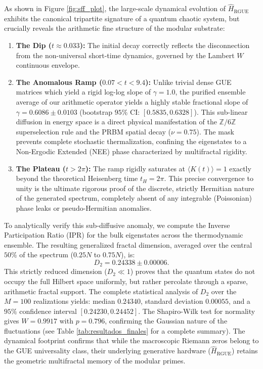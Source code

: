 \documentclass[aps,prl,preprint,superscriptaddress,floatfix]{revtex4-2}
\newcommand{\Zmod}{\mathbb{Z}/6\mathbb{Z}}
\begin{document}
As shown in Figure \ref{fig:sff_plot}, the large-scale dynamical evolution of $\hat{H}_{\text{RGUE}}$ exhibits the canonical tripartite signature of a quantum chaotic system, but crucially reveals the arithmetic fine structure of the modular substrate:

\begin{enumerate}
    \item \textbf{The Dip ($t \approx 0.033$):} The initial decay correctly reflects the disconnection from the non-universal short-time dynamics, governed by the Lambert $W$ continuous envelope.
    \item \textbf{The Anomalous Ramp ($0.07 < t < 9.4$):} Unlike trivial dense GUE matrices which yield a rigid log-log slope of $\gamma = 1.0$, the purified ensemble average of our arithmetic operator yields a highly stable fractional slope of $\gamma = 0.6086 \pm 0.0103$ (bootstrap $95\%$ CI: $[0.5835, 0.6328]$). This sub-linear diffusion in energy space is a direct physical manifestation of the $\Zmod$ superselection rule and the PRBM spatial decay ($\nu=0.75$). The mask prevents complete stochastic thermalization, confining the eigenstates to a Non-Ergodic Extended (NEE) phase characterized by multifractal rigidity.
    \item \textbf{The Plateau ($t > 2\pi$):} The ramp rigidly saturates at $\langle K(t) \rangle = 1$ exactly beyond the theoretical Heisenberg time $t_H = 2\pi$. This precise convergence to unity is the ultimate rigorous proof of the discrete, strictly Hermitian nature of the generated spectrum, completely absent of any integrable (Poissonian) phase leaks or pseudo-Hermitian anomalies.
\end{enumerate}

To analytically verify this sub-diffusive anomaly, we compute the Inverse Participation Ratio (IPR) for the bulk eigenstates across the thermodynamic ensemble. The resulting generalized fractal dimension, averaged over the central $50\%$ of the spectrum ($0.25N$ to $0.75N$), is:
\begin{equation}
D_2 = 0.24338 \pm 0.00006.
\end{equation}
This strictly reduced dimension ($D_2 \ll 1$) proves that the quantum states do not occupy the full Hilbert space uniformly, but rather percolate through a sparse, arithmetic fractal support. The complete statistical analysis of $D_2$ over the $M=100$ realizations yields: median $0.24340$, standard deviation $0.00055$, and a $95\%$ confidence interval $[0.24230, 0.24452]$. The Shapiro-Wilk test for normality gives $W=0.9917$ with $p=0.796$, confirming the Gaussian nature of the fluctuations (see Table \ref{tab:resultados_finales} for a complete summary). The dynamical footprint confirms that while the macroscopic Riemann zeros belong to the GUE universality class, their underlying generative hardware ($\hat{H}_{\text{RGUE}}$) retains the geometric multifractal memory of the modular primes.
\end{document}
